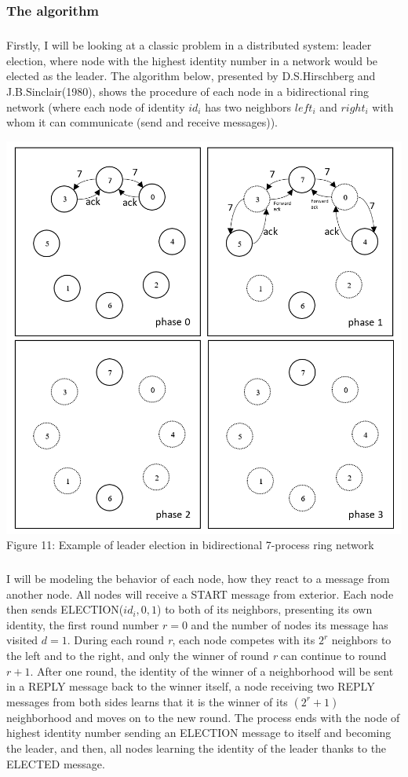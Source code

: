 \documentclass{article}
\begin{document}
	\subsubsection{The algorithm \cite{b2}}
	\subparagraph{}Firstly, I will be looking at a classic problem in a distributed system: leader election, where node with the highest identity number in a network would be elected as the leader. The algorithm below, presented by D.S.Hirschberg and J.B.Sinclair(1980), shows the procedure of each node in a bidirectional ring network (where each node of identity $id_{i}$ has two neighbors $left_{i}$ and $right_{i}$ with whom it can communicate (send and receive messages)). 
	\begin{center}
		\includegraphics[scale=0.5]{Nlogn}
		\\Figure 11: Example of leader election in bidirectional 7-process ring network			
	\end{center}
	\subparagraph{}I will be modeling the behavior of each node, how they react to a message from another node. All nodes will receive a START message from exterior. Each node then sends ELECTION($id_{i},0,1$) to both of its neighbors, presenting its own identity, the first round number $r=0$ and the number of nodes its message has visited $d=1$. During each round \textit{r}, each node competes with its $2^{\mathit{r}}$ neighbors to the left and to the right, and only the winner of round \textit{r} can continue to round $\mathit{r}+1$. After one round, the identity of the winner of a neighborhood will be sent in a REPLY message back to the winner itself, a node receiving two REPLY messages from both sides learns that it is the winner of its $(2^{r}+1)$ neighborhood and moves on to the new round. The process ends with the node of highest identity number sending an ELECTION message to itself and becoming the leader, and then, all nodes learning the identity of the leader thanks to the ELECTED message.
\end{document}
